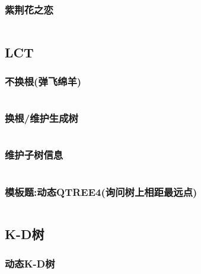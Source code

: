 \documentclass[a4paper, twoside]{article}
\begin{document}
\begin{multicols}{2}
				\subsubsection{紫荆花之恋}
					\inputminted{cpp}{../src/datastructure/紫荆花之恋.cpp}
	
			\subsection{LCT}
				\subsubsection{不换根(弹飞绵羊)}
					\inputminted{cpp}{../src/datastructure/LCT(不换根).cpp}
			
				\subsubsection{换根/维护生成树}
					\inputminted{cpp}{../src/datastructure/LCT(换根).cpp}

				\subsubsection{维护子树信息}
					\inputminted{cpp}{../src/datastructure/LCT维护子树信息.cpp}
					
				\subsubsection{模板题:动态QTREE4(询问树上相距最远点)}
						\inputminted{cpp}{../src/datastructure/动态QTREE4.cpp}
	
			\subsection{K-D树}

				\subsubsection{动态K-D树}
					\inputminted{cpp}{../src/datastructure/动态KD树.cpp}
	
	
	
			

\end{multicols}
\end{document}
